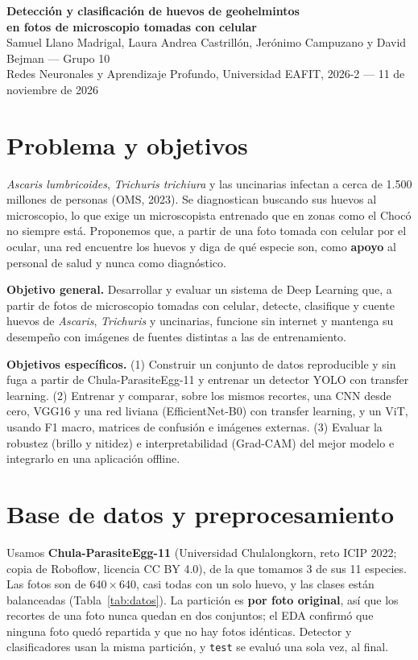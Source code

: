 \documentclass[10pt,letterpaper]{article}
\begin{document}
\begin{center}
{\Large\bfseries Detección y clasificación de huevos de geohelmintos\\en fotos de microscopio tomadas con celular}\\[3pt]
Samuel Llano Madrigal, Laura Andrea Castrillón, Jerónimo Campuzano y David Bejman --- Grupo 10\\
Redes Neuronales y Aprendizaje Profundo, Universidad EAFIT, 2026-2 --- 11 de noviembre de 2026
\end{center}

\section{Problema y objetivos}

\textit{Ascaris lumbricoides}, \textit{Trichuris trichiura} y las uncinarias infectan a cerca de 1.500 millones de personas (OMS, 2023). Se diagnostican buscando sus huevos al microscopio, lo que exige un microscopista entrenado que en zonas como el Chocó no siempre está. Proponemos que, a partir de una foto tomada con celular por el ocular, una red encuentre los huevos y diga de qué especie son, como \textbf{apoyo} al personal de salud y nunca como diagnóstico.

\textbf{Objetivo general.} Desarrollar y evaluar un sistema de Deep Learning que, a partir de fotos de microscopio tomadas con celular, detecte, clasifique y cuente huevos de \textit{Ascaris}, \textit{Trichuris} y uncinarias, funcione sin internet y mantenga su desempeño con imágenes de fuentes distintas a las de entrenamiento.

\textbf{Objetivos específicos.}
(1) Construir un conjunto de datos reproducible y sin fuga a partir de Chula-ParasiteEgg-11 y entrenar un detector YOLO con transfer learning.
(2) Entrenar y comparar, sobre los mismos recortes, una CNN desde cero, VGG16 y una red liviana (EfficientNet-B0) con transfer learning, y un ViT, usando F1 macro, matrices de confusión e imágenes externas.
(3) Evaluar la robustez (brillo y nitidez) e interpretabilidad (Grad-CAM) del mejor modelo e integrarlo en una aplicación offline.

\section{Base de datos y preprocesamiento}

Usamos \textbf{Chula-ParasiteEgg-11} (Universidad Chulalongkorn, reto ICIP 2022; copia de Roboflow, licencia CC BY 4.0), de la que tomamos 3 de sus 11 especies. Las fotos son de 640\,$\times$\,640, casi todas con un solo huevo, y las clases están balanceadas (Tabla~\ref{tab:datos}). La partición es \textbf{por foto original}, así que los recortes de una foto nunca quedan en dos conjuntos; el EDA confirmó que ninguna foto quedó repartida y que no hay fotos idénticas. Detector y clasificadores usan la misma partición, y \texttt{test} se evaluó una sola vez, al final.
\end{document}
